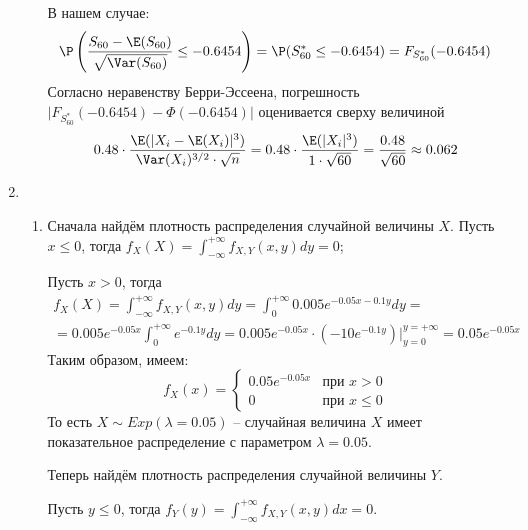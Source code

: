 \begin{enumerate}
\begin{enumerate}
В нашем случае:
\[
\P\left( \frac{S_{60} - \E(S_{60})}{\sqrt{\Var(S_{60})}} \leq -0.6454 \right) = \P(S^*_{60} \leq -0.6454) =
F_{S^*_{60}} (-0.6454)
\]
Согласно неравенству Берри-Эссеена, погрешность $\vert F_{S^*_{60}} (-0.6454) - \Phi(-0.6454) \vert$ оценивается сверху величиной
\[
0.48 \cdot \frac{\E(\vert X_i - \E(X_i) \vert^3 )}{\Var(X_i)^{3/2} \cdot \sqrt{n}} = 0.48 \cdot \frac{\E(\vert X_i \vert^3)}{1\cdot\sqrt{60}} = \frac{0.48}{\sqrt{60}} \approx0.062
\]
\end{enumerate}
\item \begin{enumerate}
\item Сначала найдём плотность распределения случайной величины $X$. Пусть $x \leq 0 $, тогда $f_X (X) = \int_{-\infty}^{+\infty} f_{X, Y} (x, y) dy  = 0$;

Пусть $x >0 $, тогда
\begin{multline*}
f_X (X) = \int_{-\infty}^{+\infty} f_{X, Y} (x, y) dy = \int_{0}^{+\infty} 0.005 e^{-0.05x-0.1y} dy = \\
= 0.005e^{-0.05x} \int_{0}^{+\infty} e^{-0.1y} dy = 0.005e^{-0.05x} \cdot \left(-10e^{-0.1y} \right) \bigg\vert_{y=0}^{y=+\infty} = 0.05 e^{-0.05x}
\end{multline*}
Таким образом, имеем:
\[
f_X (x) = \begin{cases}
0.05 e^{-0.05x} & \text{при } x>0 \\
0 & \text{при } x \leq 0
\end{cases}
\]
То есть $X \sim Exp(\lambda=0.05)$ – случайная величина $X$ имеет показательное распределение с параметром $\lambda = 0.05$.

Теперь найдём плотность распределения случайной величины $Y$.

Пусть $y \leq 0 $, тогда $f_Y (y) = \int_{-\infty}^{+\infty} f_{X, Y} (x, y) dx  = 0$.


\end{enumerate}
\end{enumerate}
